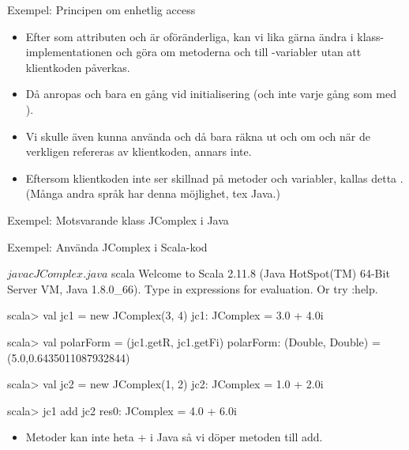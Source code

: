 \begin{Slide}{Exempel: Principen om enhetlig access}\SlideFontSmall
{}
\pause
\begin{itemize}
\item Efter som attributen  och  är oföränderliga, kan vi lika gärna ändra i klass-implementationen och göra om metoderna  och  till -variabler utan att klientkoden påverkas. 

\item Då anropas  och  bara en gång vid initialisering (och inte varje gång som med ).

\item Vi skulle även kunna använda  och då bara räkna ut  och  om och när de verkligen refereras av klientkoden, annars inte.

\item Eftersom klientkoden inte ser skillnad på metoder och variabler, kallas detta . (Många andra språk har  denna möjlighet, tex Java.)
\end{itemize}
\end{Slide}




\begin{Slide}{Exempel: Motsvarande klass JComplex i Java}\SlideFontSmall
{}
\end{Slide}




\begin{Slide}{Exempel: Använda JComplex i Scala-kod}
\begin{REPL}
$ javac JComplex.java 
$ scala
Welcome to Scala 2.11.8 (Java HotSpot(TM) 64-Bit Server VM, Java 1.8.0_66).
Type in expressions for evaluation. Or try :help.

scala> val jc1 = new JComplex(3, 4)
jc1: JComplex = 3.0 + 4.0i

scala> val polarForm = (jc1.getR, jc1.getFi)
polarForm: (Double, Double) = (5.0,0.6435011087932844)

scala> val jc2 = new JComplex(1, 2)
jc2: JComplex = 1.0 + 2.0i

scala> jc1 add jc2
res0: JComplex = 4.0 + 6.0i
\end{REPL}
\begin{itemize}
\item Metoder kan inte heta + i Java så vi döper metoden till add.
\end{itemize}
\end{Slide}




